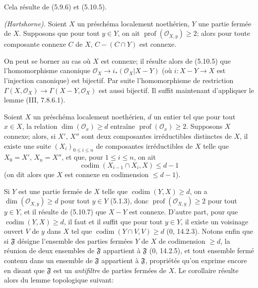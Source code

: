 Cela résulte de (5.9.6) et (5.10.5).

\begin{theorem}[5.10.7]
\label{IV.2.s5.10.7-fr}
\emph{(Hartshorne).} Soient $X$ un préschéma localement noethérien, $Y$ une
partie fermée de $X$. Supposons que pour tout $y\in Y$, on ait
$\operatorname{prof}(\mathcal O_{X,y})\geq2$; alors pour toute composante
connexe $C$ de $X$, $C-(C\cap Y)$ est connexe.
\end{theorem}

On peut se borner au cas où $X$ est connexe; il résulte alors de (5.10.5) que
l'homomorphisme canonique
$\mathcal O_X\to i_*(\mathcal O_X|X-Y)$ (où $i:X-Y\to X$ est l'injection
canonique) est bijectif. Par suite l'homomorphisme de restriction
$\Gamma(X,\mathcal O_X)\to\Gamma(X-Y,\mathcal O_X)$ est aussi bijectif. Il
suffit maintenant d'appliquer le lemme (III, 7.8.6.1).

\begin{corollary}[5.10.8]
\label{IV.2.s5.10.8-fr}
Soient $X$ un préschéma localement noethérien, $d$ un entier tel que pour tout
$x\in X$, la relation $\dim(\mathcal O_x)\geq d$ entraîne
$\operatorname{prof}(\mathcal O_x)\geq2$. Supposons $X$ connexe; alors, si
$X'$, $X''$ sont deux composantes irréductibles distinctes de $X$, il existe
une suite $(X_i)_{0\leq i\leq n}$ de composantes irréductibles de $X$ telle
que $X_0=X'$, $X_n=X''$, et que, pour $1\leq i\leq n$, on ait
\[
\operatorname{codim}(X_{i-1}\cap X_i,X)\leq d-1
\]
(on dit alors que $X$ est connexe en codimension $\leq d-1$).
\end{corollary}

Si $Y$ est une partie fermée de $X$ telle que
$\operatorname{codim}(Y,X)\geq d$, on a $\dim(\mathcal O_{X,y})\geq d$ pour
tout $y\in Y$ (5.1.3), donc $\operatorname{prof}(\mathcal O_{X,y})\geq2$ pour
tout $y\in Y$, et il résulte de (5.10.7) que $X-Y$ est connexe. D'autre part,
pour que $\operatorname{codim}(Y,X)\geq d$, il faut et il suffit que pour tout
$y\in Y$, il existe un voisinage ouvert $V$ de $y$ dans $X$ tel que
$\operatorname{codim}(Y\cap V,V)\geq d$ (0, 14.2.3). Notons enfin que si
$\mathfrak F$ désigne l'ensemble des parties fermées $Y$ de $X$ de
codimension $\geq d$, la réunion de deux ensembles de $\mathfrak F$ appartient
à $\mathfrak F$ (0, 14.2.5), et tout ensemble fermé contenu dans un ensemble
de $\mathfrak F$ appartient à $\mathfrak F$, propriétés qu'on exprime encore
en disant que $\mathfrak F$ est un \emph{antifiltre} de parties fermées de
$X$. Le corollaire résulte alors du lemme topologique suivant:

